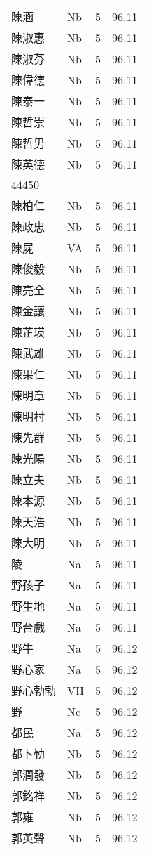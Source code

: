 \documentclass[twocolumn]{book}
\begin{document}
\begin{supertabular}{llrr}
陳涵 & Nb & 5 &  96.11\\
陳淑惠 & Nb & 5 &  96.11\\
陳淑芬 & Nb & 5 &  96.11\\
陳偉德 & Nb & 5 &  96.11\\
陳泰一 & Nb & 5 &  96.11\\
陳哲崇 & Nb & 5 &  96.11\\
陳哲男 & Nb & 5 &  96.11\\
陳英德 & Nb & 5 &  96.11\\
44450\\
陳柏仁 & Nb & 5 &  96.11\\
陳政忠 & Nb & 5 &  96.11\\
陳屍 & VA & 5 &  96.11\\
陳俊毅 & Nb & 5 &  96.11\\
陳亮全 & Nb & 5 &  96.11\\
陳金讓 & Nb & 5 &  96.11\\
陳芷瑛 & Nb & 5 &  96.11\\
陳武雄 & Nb & 5 &  96.11\\
陳果仁 & Nb & 5 &  96.11\\
陳明章 & Nb & 5 &  96.11\\
陳明村 & Nb & 5 &  96.11\\
陳先群 & Nb & 5 &  96.11\\
陳光陽 & Nb & 5 &  96.11\\
陳立夫 & Nb & 5 &  96.11\\
陳本源 & Nb & 5 &  96.11\\
陳天浩 & Nb & 5 &  96.11\\
陳大明 & Nb & 5 &  96.11\\
陵 & Na & 5 &  96.11\\
野孩子 & Na & 5 &  96.11\\
野生地 & Na & 5 &  96.11\\
野台戲 & Na & 5 &  96.11\\
野牛 & Na & 5 &  96.12\\
野心家 & Na & 5 &  96.12\\
野心勃勃 & VH & 5 &  96.12\\
野 & Nc & 5 &  96.12\\
都民 & Na & 5 &  96.12\\
都卜勒 & Nb & 5 &  96.12\\
郭潤發 & Nb & 5 &  96.12\\
郭銘祥 & Nb & 5 &  96.12\\
郭雍 & Nb & 5 &  96.12\\
郭英聲 & Nb & 5 &  96.12\\

\end{supertabular}
\end{document}
